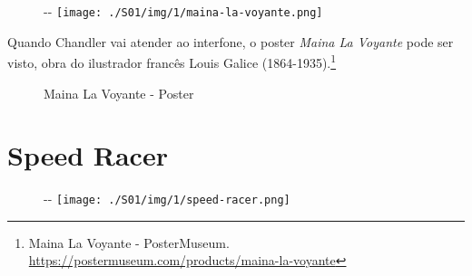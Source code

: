 \begin{figure}[!ht]
  \begin{adjustwidth}{-\oddsidemargin-1in}{-\rightmargin}
    \centering
    \texttt{[image: ./S01/img/1/maina-la-voyante.png]}
  \end{adjustwidth}
\end{figure}

\saveparinfos
\noindent
\begin{minipage}[c]{0.5\textwidth}\useparinfo

Quando Chandler vai atender ao interfone, o poster \emph{Maina La
Voyante} pode ser visto, obra do ilustrador francês Louis Galice
(1864-1935).\footnote{\sloppy Maina La Voyante - PosterMuseum. \url{https://postermuseum.com/products/maina-la-voyante}}

\end{minipage}\hfill
\begin{minipage}[c]{0.6\textwidth}

\begin{figure}
  \centering
    \caption{Maina La Voyante - Poster\label{fig:maina-la-voyante-poster}}
\end{figure}

\end{minipage}

\hypertarget{speed-racer}{%
\section{Speed Racer}\label{speed-racer}}

\begin{figure}[!ht]
  \begin{adjustwidth}{-\oddsidemargin-1in}{-\rightmargin}
    \centering
    \texttt{[image: ./S01/img/1/speed-racer.png]}
  \end{adjustwidth}
\end{figure}


